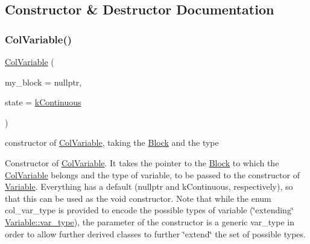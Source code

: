 \subsection{Constructor \& Destructor Documentation}
\mbox{\label{class_s_m_spp__di__unipi__it_1_1_col_variable_a437575a777dfea71a3cd92dbd6e358af}} 
\subsubsection{\texorpdfstring{Col\+Variable()}{ColVariable()}}
{\footnotesize\ttfamily \mbox{\hyperlink{class_s_m_spp__di__unipi__it_1_1_col_variable}{Col\+Variable}} (\begin{DoxyParamCaption}\item[{\mbox{\hyperlink{class_s_m_spp__di__unipi__it_1_1_block}{Block}} $\ast$}]{my\+\_\+block = {\ttfamily nullptr},  }\item[{const \mbox{\hyperlink{class_s_m_spp__di__unipi__it_1_1_variable_a32378add5594ab0f1fb45e711d88924d}{var\+\_\+type}}}]{state = {\ttfamily \mbox{\hyperlink{class_s_m_spp__di__unipi__it_1_1_col_variable_ae6a9c27f20ec8030a1aef0c5b655c4e1abe6ad916b46098fac21a307ea72f206e}{k\+Continuous}}} }\end{DoxyParamCaption})\hspace{0.3cm}{\ttfamily [inline]}}



constructor of \mbox{\hyperlink{class_s_m_spp__di__unipi__it_1_1_col_variable}{Col\+Variable}}, taking the \mbox{\hyperlink{class_s_m_spp__di__unipi__it_1_1_block}{Block}} and the type 

Constructor of \mbox{\hyperlink{class_s_m_spp__di__unipi__it_1_1_col_variable}{Col\+Variable}}. It takes the pointer to the \mbox{\hyperlink{class_s_m_spp__di__unipi__it_1_1_block}{Block}} to which the \mbox{\hyperlink{class_s_m_spp__di__unipi__it_1_1_col_variable}{Col\+Variable}} belongs and the type of variable, to be passed to the constructor of \mbox{\hyperlink{class_s_m_spp__di__unipi__it_1_1_variable}{Variable}}. Everything has a default (nullptr and k\+Continuous, respectively), so that this can be used as the void constructor. Note that while the enum col\+\_\+var\+\_\+type is provided to encode the possible types of variable (\char`\"{}extending\char`\"{} \mbox{\hyperlink{class_s_m_spp__di__unipi__it_1_1_variable_a32378add5594ab0f1fb45e711d88924d}{Variable\+::var\+\_\+type}}), the parameter of the constructor is a generic var\+\_\+type in order to allow further derived classes to further \char`\"{}extend\char`\"{} the set of possible types.

